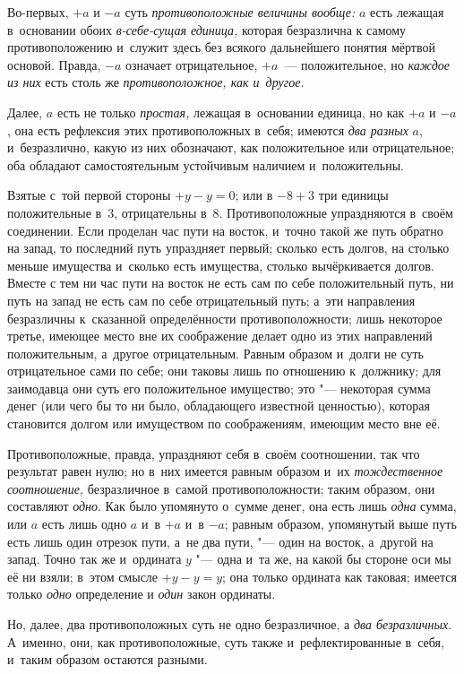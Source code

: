Во-первых, $+a$ и $-a$ суть {\em противоположные величины вообще:}
$a$ есть лежащая в~основании обоих
{\em в-себе-сущая единица,} которая безразлична к
самому противоположению и~служит здесь без всякого дальнейшего понятия
мёртвой основой. Правда, $-a$ означает
отрицательное, $+a$~--- положительное, но
{\em каждое из них} есть столь же {\em противоположное, как и~другое}.

Далее, $a$ есть не только {\em простая,} лежащая в~основании единица, но как
$+a$ и $-a$, она есть рефлексия этих противоположных в~себя; имеются {\em два
разных} $a$, и~безразлично, какую из них обозначают, как положительное или
отрицательное; оба обладают самостоятельным устойчивым наличием и~положительны.

Взятые с~той первой стороны $+y-y=0$; или в $-8+3$ три единицы положительные
в~3, отрицательны в~8. Противоположные упраздняются в~своём соединении. Если
проделан час пути на восток, и~точно такой же путь обратно на запад, то
последний путь упраздняет первый; сколько есть долгов, на столько меньше
имущества и~сколько есть имущества, столько вычёркивается долгов. Вместе с
тем ни час пути на восток не есть сам по себе положительный путь, ни путь
на запад не есть сам по себе отрицательный путь; а~эти направления
безразличны к~сказанной определённости противоположности; лишь некоторое
третье, имеющее место вне их соображение делает одно из этих направлений
положительным, а~другое отрицательным. Равным образом и~долги не суть
отрицательное сами по себе; они таковы лишь по отношению к~должнику; для
заимодавца они суть его положительное имущество; это "--- некоторая сумма
денег (или чего бы то ни было, обладающего известной ценностью), которая
становится долгом или имуществом по соображениям, имеющим место вне её.

Противоположные, правда, упраздняют себя в~своём соотношении, так что
результат равен нулю; но в~них имеется равным образом и~их
{\em тождественное соотношение,} безразличное в~самой
противоположности; таким образом, они составляют
{\em одно}. Как было упомянуто о~сумме денег, она есть
лишь {\em одна} сумма, или $a$ есть лишь одно $a$ и~в $+a$ и~в $-a$; равным
образом, упомянутый выше путь есть лишь один отрезок пути, а~не два
пути, "--- один на восток, а~другой на запад. Точно так же и~ордината
$y$ "--- одна и~та же, на какой бы стороне оси мы её ни
взяли; в~этом смысле $+y-y=y$; она только ордината как таковая;
имеется только {\em одно} определение и {\em один} закон ординаты.

Но, далее, два противоположных суть не одно безразличное, а
{\em два безразличных}. А~именно, они, как противоположные, суть также
и~рефлектированные в~себя, и~таким образом остаются разными.

